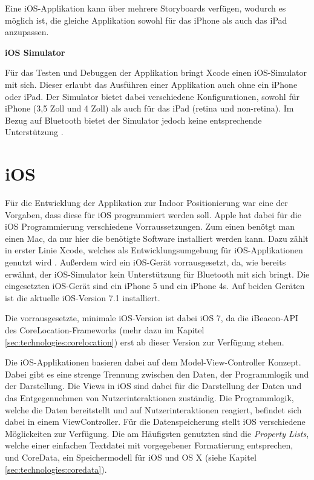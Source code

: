 Eine iOS-Applikation kann über mehrere Storyboards verfügen, wodurch es möglich ist, die gleiche Applikation sowohl für das iPhone als auch das iPad anzupassen.


\textbf{iOS Simulator}

Für das Testen und Debuggen der Applikation bringt Xcode einen iOS-Simulator mit sich. Dieser erlaubt das Ausführen einer Applikation auch ohne ein iPhone oder iPad. Der Simulator bietet dabei verschiedene Konfigurationen, sowohl für iPhone (3,5 Zoll und 4 Zoll) als auch für das iPad (retina und non-retina).
Im Bezug auf Bluetooth bietet der Simulator jedoch keine entsprechende Unterstützung \cite{iossimulator}.

\section{iOS}
\label{sec:technologies:iosandxcode}
Für die Entwicklung der Applikation zur Indoor Positionierung war eine der Vorgaben, dass diese für iOS programmiert werden soll.
Apple hat dabei für die iOS Programmierung verschiedene Vorraussetzungen. Zum einen benötgt man einen Mac, da nur hier die benötigte Software installiert werden kann.
Dazu zählt in erster Linie Xcode, welches als Entwicklungsumgebung für iOS-Applikationen genutzt wird \cite{iossetup}. 
Außerdem wird ein iOS-Gerät vorrausgesetzt, da, wie bereits erwähnt, der iOS-Simulator kein Unterstützung für Bluetooth mit sich bringt. 
Die eingesetzten iOS-Gerät sind ein iPhone 5 und ein iPhone 4s. Auf beiden Geräten ist die aktuelle iOS-Version 7.1 installiert.

Die vorrausgesetzte, minimale iOS-Version ist dabei iOS 7, da die iBeacon-API des CoreLocation-Frameworks (mehr dazu im Kapitel \ref{sec:technologies:corelocation}) erst ab dieser Version zur Verfügung stehen.

Die iOS-Applikationen basieren dabei auf dem Model-View-Controller Konzept. Dabei gibt es eine strenge Trennung zwischen den Daten, der Programmlogik und der Darstellung. 
Die Views in iOS sind dabei für die Darstellung der Daten und das Entgegennehmen von Nutzerinteraktionen zuständig. Die Programmlogik, welche die Daten bereitstellt und auf Nutzerinteraktionen reagiert, befindet sich dabei in einem ViewController. Für die Datenspeicherung stellt iOS verschiedene Möglickeiten zur Verfügung. Die am Häufigsten genutzten sind die \emph{Property Lists}, welche einer einfachen Textdatei mit vorgegebener Formatierung entsprechen, und CoreData, ein Speichermodell für iOS und OS X (siehe Kapitel \ref{sec:technologies:coredata}).


